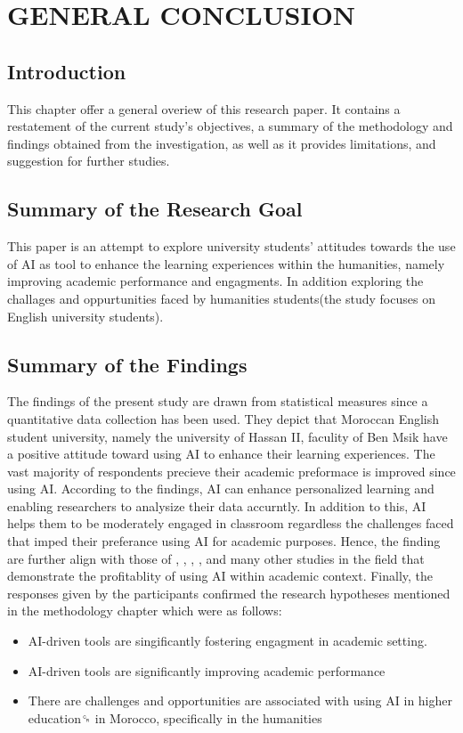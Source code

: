 \chapter{GENERAL CONCLUSION}
\section{Introduction}
This chapter offer a general overiew of this research paper.
It contains a restatement of the current study's objectives, a summary of
the methodology and findings obtained from the investigation, as well as it provides
limitations, and suggestion for further studies.

\section{Summary of the Research Goal}
This paper is an attempt to explore university students’ attitudes towards the use of
AI as tool to enhance the learning experiences within the humanities, namely improving
academic performance and engagments. In addition exploring the challages and oppurtunities
faced by humanities students(the study focuses on English university students).

\section{Summary of the Findings}
The findings of the present study are drawn from statistical measures since a
quantitative data collection has been used. They depict
that Moroccan English student university, namely the university of Hassan II, faculity of Ben
Msik have a positive attitude toward using AI to enhance their learning experiences.
The vast majority of respondents precieve their academic preformace is improved since using
AI. According to the findings, AI can enhance personalized learning and enabling researchers
to analysize their data accurntly. In addition to this, AI helps them to be moderately engaged
in classroom regardless the challenges faced that imped their preferance using AI for academic
purposes. Hence, the finding are further align with those of \citep{mohammed_exploring_2023},
\citep{lyz_students_2022}, \citep{guerrero-quinonez_artificial_2023}, \citep{l_d_of_cs_akshara_first_grade_college_2023},
and many other studies in the field that demonstrate the profitablity of using AI within academic context.
Finally, the responses given by the participants confirmed the research
hypotheses mentioned in the methodology chapter which were as follows:
\begin{itemize}
	\item AI-driven tools are singificantly fostering engagment in academic setting.
	\item AI-driven tools are significantly improving academic performance
	\item There are challenges and opportunities are associated with using AI in higher education␍
	      in Morocco, specifically in the humanities
\end{itemize}

